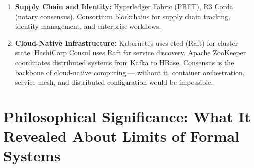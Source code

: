 \begin{enumerate}
\item \textbf{Supply Chain and Identity:} Hyperledger Fabric (PBFT), R3 Corda (notary consensus). Consortium blockchains for supply chain tracking, identity management, and enterprise workflows.

\item \textbf{Cloud-Native Infrastructure:} Kubernetes uses etcd (Raft) for cluster state. HashiCorp Consul uses Raft for service discovery. Apache ZooKeeper coordinates distributed systems from Kafka to HBase. Consensus is the backbone of cloud-native computing — without it, container orchestration, service mesh, and distributed configuration would be impossible.
\end{enumerate}

\section{Philosophical Significance: What It Revealed About Limits of Formal Systems}
\label{sec:consensus:philosophy}

